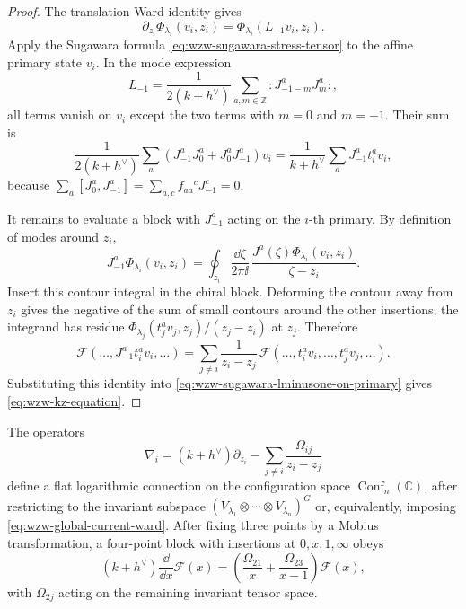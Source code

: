 \begin{proof}
The translation Ward identity gives
\[
  \partial_{z_i}\Phi_{\lambda_i}(v_i,z_i)
  =
  \Phi_{\lambda_i}(L_{-1}v_i,z_i).
\]
Apply the Sugawara formula
\eqref{eq:wzw-sugawara-stress-tensor} to the affine primary state
\(v_i\).  In the mode expression
\[
  L_{-1}
  =
  \frac{1}{2(k+h^\vee)}
  \sum_{a,m\in\mathbb Z}
  :J^a_{-1-m}J^a_m: ,
\]
all terms vanish on \(v_i\) except the two terms with \(m=0\) and
\(m=-1\).  Their sum is
\begin{equation}
  \frac{1}{2(k+h^\vee)}
  \sum_a
  \left(J^a_{-1}J^a_0+J^a_0J^a_{-1}\right)v_i
  =
  \frac{1}{k+h^\vee}
  \sum_a J^a_{-1}t_i^a v_i ,
  \label{eq:wzw-sugawara-lminusone-on-primary}
\end{equation}
because
\(\sum_a[J^a_0,J^a_{-1}]
=\sum_{a,c}f_{aa}{}^cJ^c_{-1}=0\).

It remains to evaluate a block with \(J^a_{-1}\) acting on the \(i\)-th
primary.  By definition of modes around \(z_i\),
\[
  J^a_{-1}\Phi_{\lambda_i}(v_i,z_i)
  =
  \oint_{z_i}\frac{\dd\zeta}{2\pi\ii}\,
  \frac{J^a(\zeta)\Phi_{\lambda_i}(v_i,z_i)}{\zeta-z_i}.
\]
Insert this contour integral in the chiral block.  Deforming the contour away
from \(z_i\) gives the negative of the sum of small contours around the other
insertions; the integrand has residue
\(\Phi_{\lambda_j}(t_j^a v_j,z_j)/(z_j-z_i)\) at \(z_j\).  Therefore
\[
  \mathcal F(\ldots,J^a_{-1}t_i^av_i,\ldots)
  =
  \sum_{j\ne i}
  \frac{1}{z_i-z_j}\,
  \mathcal F(\ldots,t_i^a v_i,\ldots,t_j^a v_j,\ldots).
\]
Substituting this identity into
\eqref{eq:wzw-sugawara-lminusone-on-primary} gives
\eqref{eq:wzw-kz-equation}.
\end{proof}

\begin{lemma}
\label{lem:wzw-kz-flatness-four-point}
The operators
\begin{equation}
  \nabla_i
  =
  (k+h^\vee)\partial_{z_i}
  -
  \sum_{j\ne i}\frac{\Omega_{ij}}{z_i-z_j}
  \label{eq:wzw-kz-connection}
\end{equation}
define a flat logarithmic connection on the configuration space
\(\operatorname{Conf}_n(\mathbb C)\), after restricting to the invariant
subspace \(\left(V_{\lambda_1}\otimes\cdots\otimes V_{\lambda_n}\right)^G\)
or, equivalently, imposing \eqref{eq:wzw-global-current-ward}.  After fixing
three points by a Mobius transformation, a four-point block with insertions
at \(0,x,1,\infty\) obeys
\begin{equation}
  (k+h^\vee)\frac{\dd}{\dd x}\mathcal F(x)
  =
  \left(\frac{\Omega_{21}}{x}
        +\frac{\Omega_{23}}{x-1}\right)\mathcal F(x),
  \label{eq:wzw-four-point-kz}
\end{equation}
with \(\Omega_{2j}\) acting on the remaining invariant tensor space.
\end{lemma}

